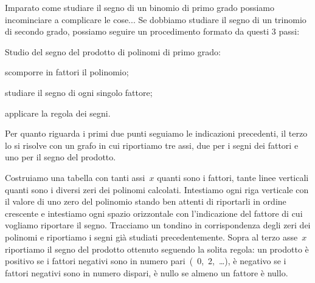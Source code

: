 Imparato come studiare il segno di un binomio di primo grado possiamo 
incominciare a complicare le cose...
Se dobbiamo studiare il segno di un trinomio di secondo grado, possiamo 
seguire un procedimento formato da questi 3 passi:

\begin{procedura}
 Studio del segno del prodotto di polinomi di primo grado:
\begin{enumeratea}
\item scomporre in fattori il polinomio;
\item studiare il segno di ogni singolo fattore;
\item applicare la regola dei segni.
\end{enumeratea}
\end{procedura}

Per quanto riguarda i primi due punti seguiamo le indicazioni precedenti, 
il terzo lo si risolve con un grafo in cui riportiamo tre assi, due per i 
segni dei fattori e uno per il segno del prodotto.

Costruiamo una tabella con tanti assi~$x$ quanti sono i fattori, tante 
linee verticali quanti sono i diversi zeri dei polinomi calcolati. 
Intestiamo ogni riga verticale con il valore di uno zero del polinomio
stando ben attenti 
di riportarli in ordine crescente e intestiamo ogni spazio orizzontale con 
l'indicazione del fattore di cui vogliamo riportare il segno. 
Tracciamo un tondino in corrispondenza degli zeri dei polinomi e riportiamo 
i segni già studiati precedentemente. 
Sopra al terzo asse~$x$ riportiamo il segno del prodotto ottenuto 
seguendo la solita regola: un prodotto è positivo se i fattori negativi 
sono in numero pari~(~0,~2,~\dots), è negativo se i fattori negativi sono in 
numero dispari, è nullo se almeno un fattore è nullo.

